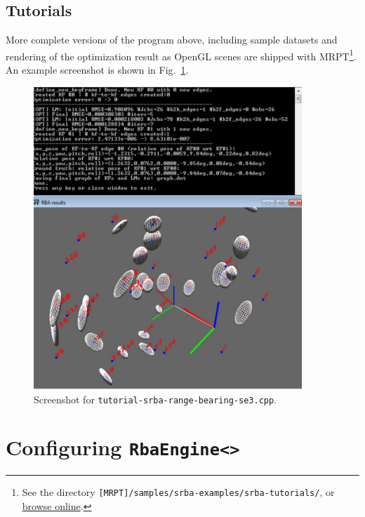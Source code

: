\documentclass[a4paper,11pt]{article}
\begin{document}
\newpage

\subsection{Tutorials}

More complete versions of the program above, including sample datasets and rendering of the optimization result 
as OpenGL scenes are shipped with MRPT\footnote{See the directory \texttt{[MRPT]/samples/srba-examples/srba-tutorials/}, 
or \href{http://mrpt.googlecode.com/svn/trunk/samples/srba-examples/srba-tutorials/}{browse online}.}.
An example screenshot is shown in Fig.~\ref{fig:screenshot.tutorial1}.

\begin{figure}[h]
\centering
\includegraphics[width=0.9\textwidth]{imgs/screenshot_tutorial_range-bearing-3D.pdf} 
\caption{Screenshot for \texttt{tutorial-srba-range-bearing-se3.cpp}.}
\label{fig:screenshot.tutorial1}
\end{figure}

\newpage

\section{Configuring \texttt{RbaEngine<>}}
\label{sect:rba_configs}
\end{document}
